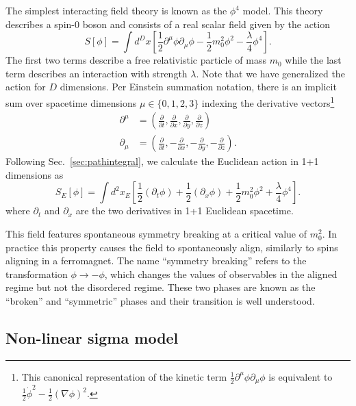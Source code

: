 \documentclass[12pt]{report}
\begin{document}
The simplest interacting field theory is known as the $\phi^4$ model. This theory describes a spin-0 boson and consists of a real scalar field given by the action
\begin{equation}
    \label{eq:phi4 action}
    S[\phi] = \int d^D x \left[ \frac{1}{2}\partial^\mu \phi \partial_\mu\phi - \frac{1}{2} m_0^2 \phi^2 - \frac{\lambda}{4}\phi^4\right].
\end{equation}
The first two terms describe a free relativistic particle of mass $m_0$ while the last term describes an interaction with strength $\lambda$. Note that we have generalized the action for $D$ dimensions. Per Einstein summation notation, there is an implicit sum over spacetime dimensions $\mu\in\{0,1,2,3\}$ indexing the derivative vectors\footnote{This canonical representation of the kinetic term $\frac{1}{2}\partial^\mu\phi\partial_\mu\phi$ is equivalent to $\frac{1}{2}\dot\phi^2-\frac{1}{2}\left(\nabla \phi\right)^2$.}
\begin{align*}
    \partial^\mu &= \left( \frac{\partial}{\partial t}, \frac{\partial}{\partial x},\frac{\partial}{\partial y}, \frac{\partial}{\partial z} \right) \\
    \partial_\mu &= \left( \frac{\partial}{\partial t}, -\frac{\partial}{\partial x}, -\frac{\partial}{\partial y}, -\frac{\partial}{\partial z} \right).
\end{align*}
Following Sec.~\ref{sec:pathintegral}, we calculate the Euclidean action in 1+1 dimensions as 
\begin{equation}
    \label{eq:phi4 euclidean action}
    S_E[\phi] = \int d^2 x_E \left[\frac{1}{2}\left(\partial_t \phi\right) + \frac{1}{2} \left(\partial_x \phi \right) + \frac{1}{2} m_0^2 \phi^2 + \frac{\lambda}{4}\phi^4\right].
\end{equation}
where $\partial_t$ and $\partial_x$ are the two derivatives in 1+1 Euclidean spacetime. 

This field features spontaneous symmetry breaking at a critical value of $m_0^2$. In practice this property causes the field to spontaneously align, similarly to spins aligning in a ferromagnet. The name ``symmetry breaking'' refers to the transformation $\phi\rightarrow-\phi$, which changes the values of observables in the aligned regime but not the disordered regime. These two phases are known as the ``broken'' and ``symmetric'' phases and their transition is well understood.


\subsection{Non-linear sigma model}
\end{document}
